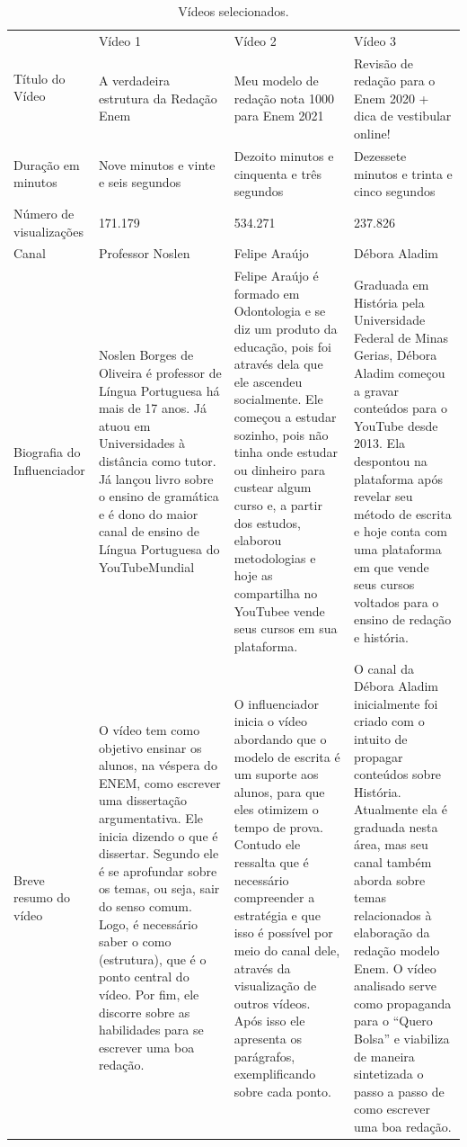 \documentclass[portuguese]{textolivre}
\begin{document}
\begin{table}[htbp]
\centering
\small
\begin{threeparttable}
\caption{Vídeos selecionados.}
\label{tbl1}
\begin{tabular}{p{2.5cm} p{3.5cm} p{3.5cm} p{3.5cm}}
\toprule
\multirow{2}{*}{Título do Vídeo} & Vídeo 1 & Vídeo 2 & Vídeo 3  \\
& A verdadeira estrutura da Redação Enem & Meu modelo de redação nota 1000 para Enem 2021 & Revisão de redação para o Enem 2020 + dica de vestibular online! \\
\arrayrulecolor[gray]{.7}
\midrule
Duração em minutos & Nove minutos e vinte e seis segundos & Dezoito minutos e cinquenta e três segundos & Dezessete minutos e trinta e cinco segundos \\
\midrule
Número de visualizações & 171.179 & 534.271 & 237.826 \\
\midrule
Canal & Professor Noslen & Felipe Araújo & Débora Aladim \\
\midrule
Biografia do Influenciador & Noslen Borges de Oliveira é professor de Língua Portuguesa há mais de 17 anos. Já atuou em Universidades à distância como tutor. Já lançou livro sobre o ensino de gramática e é dono do maior canal de ensino de Língua Portuguesa do YouTubeMundial & Felipe Araújo é formado em Odontologia e se diz um produto da educação, pois foi através dela que ele ascendeu socialmente. Ele começou a estudar sozinho, pois não tinha onde estudar ou dinheiro para custear algum curso e, a partir dos estudos, elaborou metodologias e hoje as compartilha no YouTubee vende seus cursos em sua plataforma. & Graduada em História pela Universidade Federal de Minas Gerias, Débora Aladim começou a gravar conteúdos para o YouTube desde 2013. Ela despontou na plataforma após revelar seu método de escrita e hoje conta com uma plataforma em que vende seus cursos voltados para o ensino de redação e história. \\
\midrule
Breve resumo do vídeo & O vídeo tem como objetivo ensinar os alunos, na véspera do ENEM, como escrever uma dissertação argumentativa. Ele inicia dizendo o que é dissertar. Segundo ele é se aprofundar sobre os temas, ou seja, sair do senso comum. Logo, é necessário saber o como (estrutura), que é o ponto central do vídeo. Por fim, ele discorre sobre as habilidades para se escrever uma boa redação.  & O influenciador inicia o vídeo abordando que o modelo de escrita é um suporte aos alunos, para que eles otimizem o tempo de prova. Contudo ele ressalta que é necessário compreender a estratégia e que isso é possível por meio do canal dele, através da visualização de outros vídeos. Após isso ele apresenta os parágrafos, exemplificando sobre cada ponto.  & O canal da Débora Aladim inicialmente foi criado com o intuito de propagar conteúdos sobre História. Atualmente ela é graduada nesta área, mas seu canal também aborda sobre temas relacionados à elaboração da redação modelo Enem. O vídeo analisado serve como propaganda para o “Quero Bolsa” e viabiliza de maneira sintetizada o passo a passo de como escrever uma boa redação. \\

\end{tabular}
\end{threeparttable}
\end{table}
\end{document}
